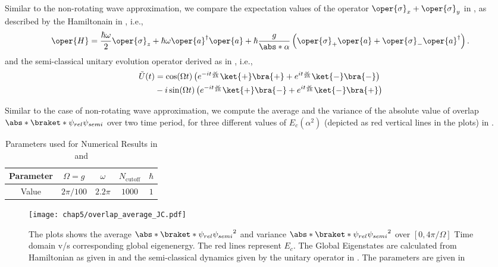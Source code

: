 Similar to the non-rotating wave approximation, we compare the expectation values of the operator
\(\oper{\sigma}_x + \oper{\sigma}_y\) in , as described by the Hamiltonain in , i.e., 
\begin{eqnarray}
\label{eq:chap5_JC_rotwave_hamiltonian}
    \oper{H} = \frac{\hbar \omega}{2} \oper{\sigma}_z + \hbar \omega\oper{a}^\dagger \oper{a}
    + \hbar \frac{g}{\abs*{\alpha}} \left(\oper{\sigma}_+ \oper{a} + \oper{\sigma}_- \oper{a}^\dagger\right).
\end{eqnarray}
and the semi-classical unitary evolution operator derived as in , i.e.,
\begin{eqnarray}
\label{eq:chap5_JC_rotwave_unitary_semi}
    \tilde{U}(t) 
    &= \cos(\Omega t) \left(e^{-i t \frac{\omega}{2\hbar}}\ket{+}\bra{+} + 
    e^{i t \frac{\omega}{2\hbar}}\ket{-}\bra{-} \right)  \nonumber \\
    &- i \sin(\Omega t)
     \left( e^{-i t \frac{\omega}{2\hbar}}\ket{+}\bra{-}
    + e^{i t \frac{\omega}{2\hbar}}\ket{-}\bra{+}\right) 
\end{eqnarray}




Similar to the case of non-rotating wave approximation, we compute the average and the 
variance of the absolute value of overlap \(\abs*{\braket*{\psi_{rel}}{\psi_{semi}}}\) over two time period, 
for three different values of \(E_c(\alpha^2)\) (depicted as red vertical lines in the plots)
in .

\begin{table}[!ht]
    \centering
    \label{tab:numerical_values_JC}
        \begin{tabular}{|c|c|c|c|c|}
            \hline
            Parameter & $\Omega = g$ & $\omega$ & $N_{\text{cutoff}}$ & $\hbar$ \\
            \hline
            Value & $2\pi/100$ & $2.2\pi$ & $1000$ & $1$ \\
            \hline
        \end{tabular}
    \caption{Parameters used for Numerical Results in  and 
    }
\end{table}

\begin{figure}[!h]
    \centering
    \texttt{[image: chap5/overlap\_average\_JC.pdf]}
    \caption{The plots shows the average $\abs*{\braket*{\psi_{rel}}{\psi_{semi}}}^2$ and 
     variance $\abs*{\braket*{\psi_{rel}}{\psi_{semi}}}^2$ over \([0, 4\pi/\Omega]\) Time domain v/s corresponding global eigenenergy. The red lines represent \(E_c\).
     The Global Eigenstates are calculated from 
    Hamiltonian as given in  and the semi-classical dynamics given by the unitary operator in . The parameters 
    are given in  }
     \label{fig:chap5_JCM_overlap_avg}
\end{figure}


